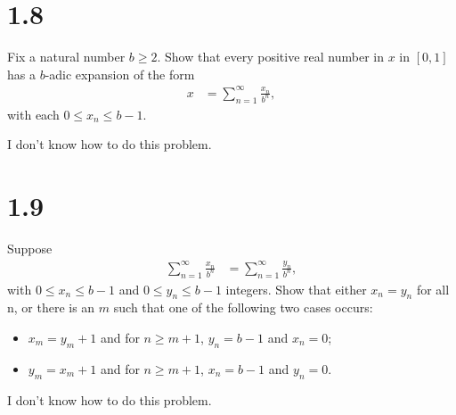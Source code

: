 \documentclass[10pt]{mypackage}
\begin{document}
\RaggedRight
\section{1.8}%
\begin{problem}
  Fix a natural number $b\geq 2$. Show that every positive real number in $x$ in $[0,1]$ has a $b$-adic expansion of the form
  \begin{align*}
    x &= \sum_{n=1}^{\infty}\frac{x_n}{b^n},
  \end{align*}
  with each $0\leq x_n \leq b-1$.
\end{problem}
\begin{solution}
  I don't know how to do this problem.
\end{solution}
\section{1.9}%
\begin{problem}
  Suppose
  \begin{align*}
    \sum_{n=1}^{\infty}\frac{x_n}{b^n} &= \sum_{n=1}^{\infty}\frac{y_n}{b^n},
  \end{align*}
  with $0 \leq x_n \leq b-1$ and $0 \leq y_n \leq b-1$ integers. Show that either $x_n = y_n$ for all n, or there is an $m$ such that one of the following two cases occurs:
  \begin{itemize}
    \item $x_m = y_m + 1$ and for $n\geq m+1$, $y_n = b-1$ and $ x_n = 0$;
    \item $y_m = x_m + 1$ and for $n\geq m+1$, $x_n = b-1$ and $y_n = 0$.
  \end{itemize}
\end{problem}
\begin{solution}
  I don't know how to do this problem.
\end{solution}
\end{document}
